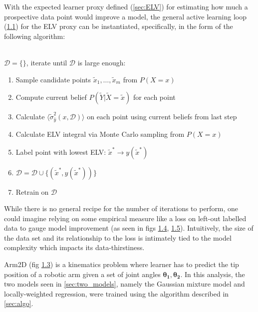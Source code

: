 \documentclass[
  letterpaper,
  DIV=11,
  numbers=noendperiod,
  oneside]{scrreprt}
\theoremstyle{remark}
\begin{document}
With the expected learner proxy defined
(\hyperref[sec:ELV]{{[}sec:ELV{]}}) for estimating how much a
prospective data point would improve a model, the general active
learning loop (\hyperref[fig:schema]{1.1}) for the ELV proxy can be
instantiated, specifically, in the form of the following algorithm:\\
\strut \\
\label{sec:algo}{} \(\mathcal{D} = \{\}\), iterate until
\(\mathcal{D}\) is large enough:

\begin{enumerate}
\def\labelenumi{\arabic{enumi}.}
\item
  Sample candidate points \(\tilde{x}_1,\ldots,\tilde{x}_m\) from
  \(P(X=x)\)
\item
  Compute current belief \(P(\tilde{Y}|\tilde{X}=\tilde{x})\) for each
  point
\item
  Calculate \(\langle\tilde{\sigma}_{\hat{y}}^2(x, \mathcal{D})\rangle\)
  on each point using current beliefs from last step
\item
  Calculate ELV integral via Monte Carlo sampling from \(P(X=x)\)
\item
  Label point with lowest ELV:
  \(\tilde{x}^* \rightarrow y(\tilde{x}^*)\)
\item
  \(\mathcal{D} = \mathcal{D} \cup \{(\tilde{x}^*, y(\tilde{x}^*))\}\)
\item
  Retrain on \(\mathcal{D}\)
\end{enumerate}

While there is no general recipe for the number of iterations to
perform, one could imagine relying on some empirical measure like a loss
on left-out labelled data to gauge model improvement (as seen in figs
\hyperref[fig:empirical:gauss]{1.4},
\hyperref[fig:empirical:regress]{1.5}). Intuitively, the size of the
data set and its relationship to the loss is intimately tied to the
model complexity which impacts its data-thirstiness.

Arm2D (fig \hyperref[fig:arm2D]{1.3}) is a kinematics problem where
learner has to predict the tip position of a robotic arm given a set of
joint angles \(\mathbf{\theta_1}, \mathbf{\theta_2}\). In this analysis,
the two models seen in \hyperref[sec:two_models]{{[}sec:two\_models{]}},
namely the Gaussian mixture model and locally-weighted regression, were
trained using the algorithm described in
\hyperref[sec:algo]{{[}sec:algo{]}}.
\end{document}
